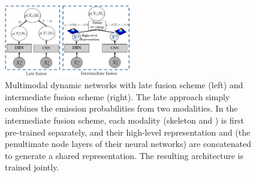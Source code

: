 \begin{figure}[t]
  \centering
  \includegraphics[width=0.5\textwidth]{images/Fusion_combined}
\vspace*{-2mm}
\caption{
\small{
Multimodal dynamic networks with late fusion scheme (left) and intermediate fusion scheme (right).
The late approach simply combines the emission probabilities from two modalities.
In the intermediate fusion scheme, each modality (skeleton and \RGBD) is first pre-trained separately,
and their high-level representation \highSK and \highRGBD (the penultimate node layers of their neural networks)
are concatenated to generate a shared representation. The resulting architecture is trained jointly.}
  }\label{fig:fusion}
\end{figure}



\endinput
